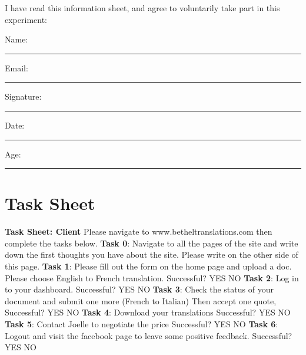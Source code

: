 \documentclass{l3proj}
\begin{document}
I have read this information sheet, and agree to voluntarily take part in this experiment: 
 
Name: \rule{200pt}{1pt} \newline \newline
Email: \rule{200pt}{1pt} \newline \newline
Signature: \rule{180pt}{1pt} \newline \newline
Date: \rule{100pt}{1pt} 
Age:  \rule{100pt}{1pt} \newline

\section{Task Sheet}
\label{sect:task-sh}
\textbf{Task Sheet: Client}\newline 
Please navigate to www.betheltranslations.com then complete the tasks below. \newline \newline
\textbf{Task 0}: Navigate to all the pages of the site and write down the first thoughts you have about the site. Please write on the other side of this page. \newline \newline
\textbf{Task 1}: Please fill out the form on the home page and upload a doc. Please choose English to French translation. \newline \newline
Successful?    YES      NO \newline \newline
\textbf{Task 2}: Log in to your dashboard.  \newline \newline
Successful?    YES      NO \newline \newline
\textbf{Task 3}: Check the status of your document and submit one more (French to Italian) Then accept one quote, \newline \newline
Successful?    YES      NO \newline \newline
\textbf{Task 4}: Download your translations \newline \newline
Successful?    YES      NO \newline \newline
\textbf{Task 5}: Contact Joelle to negotiate the price \newline \newline
Successful?    YES      NO \newline \newline
\textbf{Task 6}: Logout and visit the facebook page to leave some positive feedback. \newline \newline
Successful?    YES      NO \newline \newline
 
 
    
\end{document}
